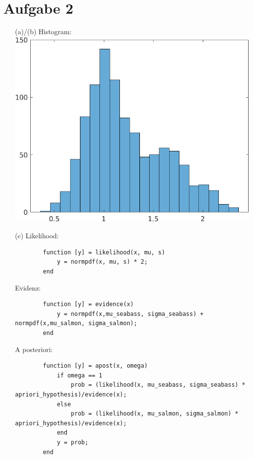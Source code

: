 \documentclass[a4paper]{scrartcl}
\begin{document}
\section*{Aufgabe 2}
\begin{itemize}
	\item[(a)/(b)] Histogram:\\
	\includegraphics*[scale = 0.5]{assignment2_data/plots/hist_fish.png}
	
	\item[(c)]
	Likelihood:
	\begin{lstlisting}
		function [y] = likelihood(x, mu, s)
			y = normpdf(x, mu, s) * 2;
		end
	\end{lstlisting}
	Evidenz: 
	\begin{lstlisting}
		function [y] = evidence(x)
			y = normpdf(x,mu_seabass, sigma_seabass) + normpdf(x,mu_salmon, sigma_salmon);
		end
	\end{lstlisting}
	A posteriori:
	\begin{lstlisting}
		function [y] = apost(x, omega)
			if omega == 1
				prob = (likelihood(x, mu_seabass, sigma_seabass) * apriori_hypothesis)/evidence(x);
			else
				prob = (likelihood(x, mu_salmon, sigma_salmon) * apriori_hypothesis)/evidence(x);
			end
			y = prob;
		end
	\end{lstlisting}
	

\end{itemize}
\end{document}
